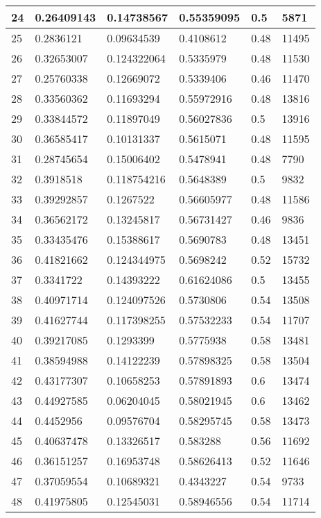 \begin{longtable}{|l|l|l|l|l|l|}
24 & 0.26409143 & 0.14738567 & 0.55359095 & 0.5 & 5871 \\ \hline 
25 & 0.2836121 & 0.09634539 & 0.4108612 & 0.48 & 11495 \\ \hline 
26 & 0.32653007 & 0.124322064 & 0.5335979 & 0.48 & 11530 \\ \hline 
27 & 0.25760338 & 0.12669072 & 0.5339406 & 0.46 & 11470 \\ \hline 
28 & 0.33560362 & 0.11693294 & 0.55972916 & 0.48 & 13816 \\ \hline 
29 & 0.33844572 & 0.11897049 & 0.56027836 & 0.5 & 13916 \\ \hline 
30 & 0.36585417 & 0.10131337 & 0.5615071 & 0.48 & 11595 \\ \hline 
31 & 0.28745654 & 0.15006402 & 0.5478941 & 0.48 & 7790 \\ \hline 
32 & 0.3918518 & 0.118754216 & 0.5648389 & 0.5 & 9832 \\ \hline 
33 & 0.39292857 & 0.1267522 & 0.56605977 & 0.48 & 11586 \\ \hline 
34 & 0.36562172 & 0.13245817 & 0.56731427 & 0.46 & 9836 \\ \hline 
35 & 0.33435476 & 0.15388617 & 0.5690783 & 0.48 & 13451 \\ \hline 
36 & 0.41821662 & 0.124344975 & 0.5698242 & 0.52 & 15732 \\ \hline 
37 & 0.3341722 & 0.14393222 & 0.61624086 & 0.5 & 13455 \\ \hline 
38 & 0.40971714 & 0.124097526 & 0.5730806 & 0.54 & 13508 \\ \hline 
39 & 0.41627744 & 0.117398255 & 0.57532233 & 0.54 & 11707 \\ \hline 
40 & 0.39217085 & 0.1293399 & 0.5775938 & 0.58 & 13481 \\ \hline 
41 & 0.38594988 & 0.14122239 & 0.57898325 & 0.58 & 13504 \\ \hline 
42 & 0.43177307 & 0.10658253 & 0.57891893 & 0.6 & 13474 \\ \hline 
43 & 0.44927585 & 0.06204045 & 0.58021945 & 0.6 & 13462 \\ \hline 
44 & 0.4452956 & 0.09576704 & 0.58295745 & 0.58 & 13473 \\ \hline 
45 & 0.40637478 & 0.13326517 & 0.583288 & 0.56 & 11692 \\ \hline 
46 & 0.36151257 & 0.16953748 & 0.58626413 & 0.52 & 11646 \\ \hline 
47 & 0.37059554 & 0.10689321 & 0.4343227 & 0.54 & 9733 \\ \hline 
48 & 0.41975805 & 0.12545031 & 0.58946556 & 0.54 & 11714 \\ \hline 

\end{longtable}
